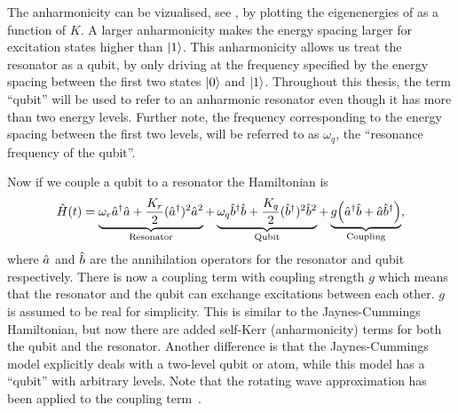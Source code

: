 \documentclass[main.tex]{subfiles}
\begin{document}
The anharmonicity can be vizualised, see , by plotting the eigenenergies of  as a function of \( K \).
A larger anharmonicity makes the energy spacing larger for excitation states higher than \(\ket{1}\).
This anharmonicity allows us treat the resonator as a qubit, by only driving at the frequency specified by the energy spacing between the first two states \( \ket{0} \) and \( \ket{1} \).
Throughout this thesis, the term ``qubit'' will be used to refer to an anharmonic resonator even though it has more than two energy levels.
Further note, the frequency corresponding to the energy spacing between the first two levels, will be referred to as \( \omega_{q} \), the ``resonance frequency of the qubit''.


Now if we couple a qubit to a resonator the Hamiltonian is
\begin{equation}
    \hat{H}(t) = \underbrace{\omega_{r}\hat{a}^\dagger\hat{a} + \frac{K_r}{2}(\hat{a}^\dagger)^2\hat{a}^2}_{\text{Resonator}} + \underbrace{\omega_{q}\hat{b}^\dagger\hat{b} + \frac{K_q}{2}(\hat{b}^\dagger)^2\hat{b}^2}_{\text{Qubit}} + \underbrace{g\qty(\hat{a}^\dagger\hat{b}+\hat{a}\hat{b}^\dagger)}_{\text{Coupling}},
    \label{eq:hamiltonian-coupled}
\end{equation}
where \( \hat{a} \) and \( \hat{b} \) are the annihilation operators for the resonator and qubit respectively.
There is now a coupling term with coupling strength \(g\) which means that the resonator and the qubit can exchange excitations between each other.
\(g\) is assumed to be real for simplicity.
This is similar to the Jaynes-Cummings Hamiltonian, but now there are added self-Kerr (anharmonicity) terms for both the qubit and the resonator.
Another difference is that the Jaynes-Cummings model explicitly deals with a two-level qubit or atom, while this model has a ``qubit'' with arbitrary levels.
Note that the rotating wave approximation has been applied to the coupling term~\cite{wu_strong-coupling_2007}.
\end{document}
